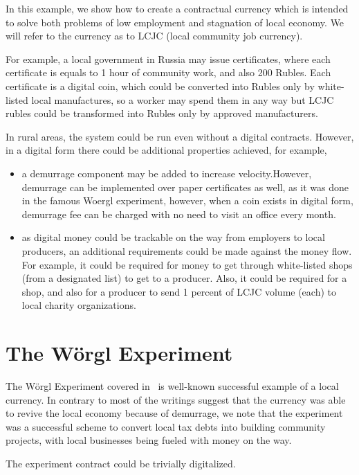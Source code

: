 \documentclass[]{llncs}   %
\begin{document}
In this example, we show how to create a contractual currency which is intended to solve both problems of low
employment and stagnation of local economy. We will refer to the currency as to LCJC (local community job currency).

For example, a local government in Russia may issue certificates, where each certificate is equals to 1 hour of community work, and also 200 Rubles. Each certificate is a digital coin, which could be converted into Rubles only by white-listed local manufactures, so a worker may spend them in any way but LCJC rubles could be transformed into Rubles only by approved manufacturers.

In rural areas, the system could be run even without a digital contracts. However, in a digital form there could be
additional properties achieved, for example,
    \begin{itemize}
        \item{} a demurrage component may be added to increase velocity.However, demurrage can be implemented over paper 
        certificates as well, as it was done in the famous Woergl experiment, however, when a coin exists in digital form,
         demurrage fee can be charged with no need to visit an office every month.
        \item{} as digital money could be trackable on the way from employers to local producers, an additional
        requirements could be made against the money flow. For example, it could be required for money to get through
        white-listed shops (from a designated list) to get to a producer. Also, it could be required for a shop, and also for a
        producer to send 1 percent of LCJC volume (each) to local charity organizations.
    \end{itemize}

\section{The W\"{o}rgl Experiment}
\label{sec-worgl}

The W\"{o}rgl Experiment covered in~\cite{muralt1934woergl} is well-known successful example of a local currency. In
contrary to most of the writings suggest that the currency was able to revive the local economy because of demurrage, we
 note that the experiment was a successful scheme to convert local tax debts into building community projects, with
 local businesses being fueled with money on the way.

The experiment contract could be trivially digitalized.
\end{document}

